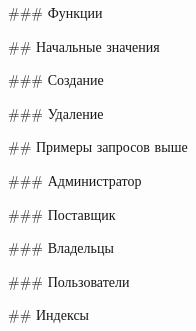 \begin{markdown}
### Функции
\end{markdown}


\begin{markdown}
## Начальные значения

### Создание
\end{markdown}


\begin{markdown}
### Удаление
\end{markdown}


\begin{markdown}
## Примеры запросов выше

### Администратор
\end{markdown}


\begin{markdown}
### Поставщик
\end{markdown}


\begin{markdown}
### Владельцы
\end{markdown}


\begin{markdown}
### Пользователи
\end{markdown}


\begin{markdown}
## Индексы
\end{markdown}
